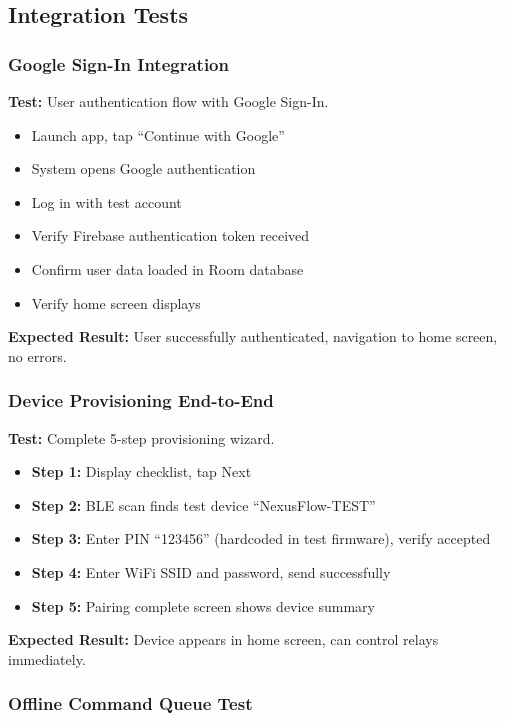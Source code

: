 \subsection{Integration Tests}

\subsubsection{Google Sign-In Integration}

\textbf{Test:} User authentication flow with Google Sign-In.

\begin{itemize}
    \item Launch app, tap ``Continue with Google''
    \item System opens Google authentication
    \item Log in with test account
    \item Verify Firebase authentication token received
    \item Confirm user data loaded in Room database
    \item Verify home screen displays
\end{itemize}

\textbf{Expected Result:} User successfully authenticated, navigation to home screen, no errors.

\subsubsection{Device Provisioning End-to-End}

\textbf{Test:} Complete 5-step provisioning wizard.

\begin{itemize}
    \item \textbf{Step 1:} Display checklist, tap Next
    \item \textbf{Step 2:} BLE scan finds test device ``NexusFlow-TEST''
    \item \textbf{Step 3:} Enter PIN ``123456'' (hardcoded in test firmware), verify accepted
    \item \textbf{Step 4:} Enter WiFi SSID and password, send successfully
    \item \textbf{Step 5:} Pairing complete screen shows device summary
\end{itemize}

\textbf{Expected Result:} Device appears in home screen, can control relays immediately.

\subsubsection{Offline Command Queue Test}

